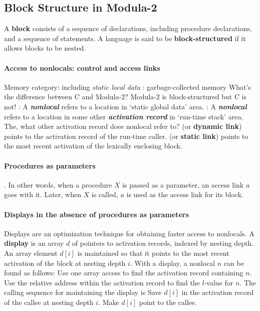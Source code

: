 \documentclass{article}
\begin{document}
\subsection{Block Structure in Modula-2}
\bit
\w A {\bf{}block} consists of a sequence of declarations, including
	procedure declarations, and a sequence of statements.
\w A language is said to be {\bf{}block-structured} if it allows
	blocks to be nested.
\eit
\paragraph{Access to nonlocals: control and access links}
\bit
\w Memory category:
	\ben
	 including {\em{}static local data}
	: garbage-collected memory
	\een
\w What's the difference between C and Modula-2?
	\bit
	\w Modula-2 is block-structured but C is not!
	: 
		A {\sl\bfseries{}nonlocal\/} refers to a location in 
		`static global data' area.
	: 
		A {\sl\bfseries{}nonlocal\/} refers to a location in 
		some other {\sl\bfseries{}activation record\/} in
		`run-time stack' area.
	\eit
\w The, what other activation record does nonlocal refer to?
	\bit
	 (or {\bf{}dynamic link}) points to the
		activation record of the run-time caller.
	 (or {\bf{}static link}) points to the most
		recent activation of the lexically enclosing block.
	\eit
\eit
\paragraph{Procedures as parameters}
\bit
{}.
	\bit
	\w In other words, when a procedure $X$ is passed as a parameter,
		an access link $a$ goes with it.
	\w Later, when $X$ is called, $a$ is used as the access link for its
		block.
	\eit
\eit
\paragraph{Displays in the absence of procedures as parameters}
\bit
\w Displays are an optimization technique for obtaining faster
	access to nonlocals.
\w A {\bf{}display} is an array $d$ of pointers to activation records,
	indexed by nesting depth.
	\bit
	\w An array element $d[i]$ is maintained so that it points to the
		most recent activation of the block at nesting depth $i$.
	\eit
\w With a display, a nonlocal $n$ can be found as follows:
	\ben	
	\w Use one array access to find the activation record containing $n$.
	\w Use the relative address within the activation record to find the
	$l$-value for $n$.
	\een
\w The calling sequence for maintaining the display is
	\ben
	\w Save $d[i]$ in the activation record of the callee at nesting
		depth $i$.
	\w Make $d[i]$ point to the callee.
	\een
\eit
\end{document}
